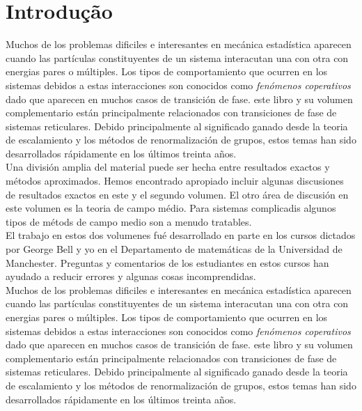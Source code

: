 

\newpage    
 \pagestyle{myheadings}  
    \setcounter{page}{1}
     \markboth{}{}
    
 \section{Introdução}
 Muchos de los problemas dificiles e interesantes en mecánica estadística aparecen
 cuando las partículas constituyentes de un sistema interacutan una con otra con
 energias pares o múltiples. Los tipos de comportamiento que ocurren en los sistemas
 debidos a estas interacciones son conocidos como \textit{fenómenos coperativos} dado que aparecen en muchos casos de transición de fase. este libro y su volumen complementario están principalmente relacionados con transiciones de fase de sistemas 
 reticulares. Debido principalmente al significado ganado desde la teoria de
 escalamiento y los métodos de renormalización de grupos, estos temas han sido 
 desarrollados rápidamente en los últimos treinta años.\\

 Una división amplia del material puede ser hecha entre resultados exactos y métodos aproximados. Hemos encontrado apropiado incluir algunas discusiones de resultados 
 exactos en este y el segundo volumen. El otro área de discusión en este volumen
 es la teoria de campo médio. Para sistemas complicadis algunos tipos de métods de campo medio son a menudo tratables.\\

 El trabajo en estos dos volumenes fué desarrollado en parte en los cursos dictados
 por George Bell y yo en el Departamento de matemáticas de la Universidad de Manchester. Preguntas y comentarios de los estudiantes en estos cursos han ayudado a reducir errores y algunas cosas incomprendidas.\\
     
 Muchos de los problemas dificiles e interesantes en mecánica estadística aparecen
 cuando las partículas constituyentes de un sistema interacutan una con otra con
 energias pares o múltiples. Los tipos de comportamiento que ocurren en los sistemas
 debidos a estas interacciones son conocidos como \textit{fenómenos coperativos} dado que aparecen en muchos casos de transición de fase. este libro y su volumen complementario están principalmente relacionados con transiciones de fase de sistemas 
 reticulares. Debido principalmente al significado ganado desde la teoria de
 escalamiento y los métodos de renormalización de grupos, estos temas han sido 
 desarrollados rápidamente en los últimos treinta años.\\

